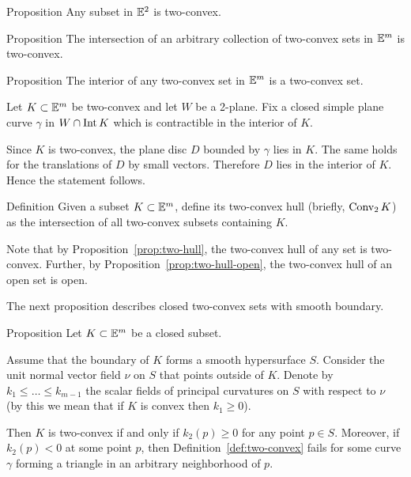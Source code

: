 \begin{thm}{Proposition}
Any subset in $\mathbb{E}^2$ is two-convex.
\end{thm}


\begin{thm}{Proposition}\label{prop:two-hull}
The intersection of an arbitrary collection of two-convex sets in $\mathbb{E}^m$ is two-convex.
\end{thm}

\begin{thm}{Proposition}\label{prop:two-hull-open}
The interior of any two-convex set in $\mathbb{E}^m$ is a two-convex set.
\end{thm}

Let $K\subset \EE^m$ be two-convex and let $W$ be a 2-plane.
Fix a closed simple plane curve $\gamma$ in $W\cap \Int K$ 
which is contractible in the interior of $K$.

Since $K$ is two-convex,
the plane disc $D$ bounded by $\gamma$ lies in $K$.
The same holds for the translations of $D$ by small vectors.
Therefore $D$ lies in the interior of $K$.
Hence the statement follows.
\qeds

\begin{thm}{Definition}
Given a subset $K\subset \EE^m$, define its two-convex hull (briefly, $\mathop{\rm Conv}\nolimits_2K$) as the intersection of all two-convex subsets containing $K$.
\end{thm}

Note that by Proposition~\ref{prop:two-hull},
the two-convex hull of any set is two-convex.
Further, 
by Proposition~\ref{prop:two-hull-open}, the
two-convex hull of an open set is open.

The next proposition describes  closed two-convex sets with smooth boundary.

\begin{thm}{Proposition}\label{prop:two-cove+smooth}
Let $K\subset \EE^m$ be a closed subset.

Assume that the boundary of $K$ forms a smooth hypersurface $S$.
Consider the unit normal vector field $\nu$ on $S$ that  points outside of $K$.
Denote by $k_1\le \dots\le k_{m-1}$ the scalar fields of principal curvatures on $S$ with respect to $\nu$ (by this we mean that  if $K$ is convex then  $k_1\ge 0$).

Then $K$ is two-convex if and only if $k_2(p)\ge 0$ for any point $p\in S$.
Moreover, if $k_2(p)<0$ at some point $p$, then Definition~\ref{def:two-convex} fails for some curve $\gamma$ forming a triangle in an arbitrary neighborhood of $p$.
\end{thm}

